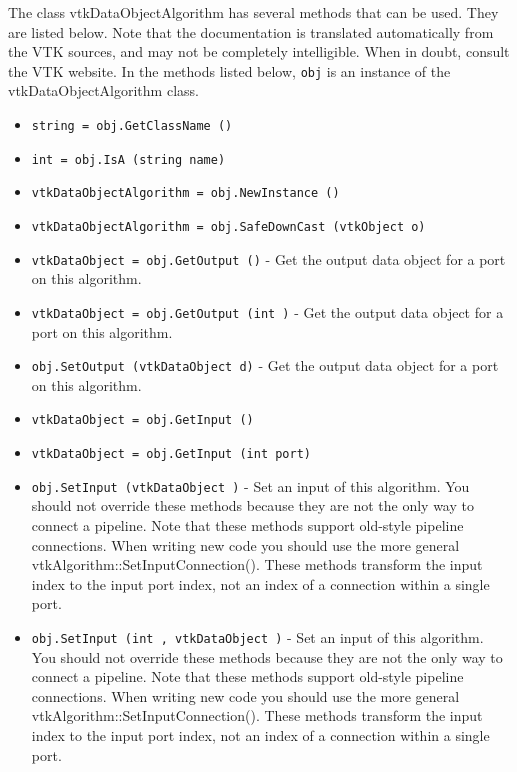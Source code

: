 The class vtkDataObjectAlgorithm has several methods that can be used.
  They are listed below.
Note that the documentation is translated automatically from the VTK sources,
and may not be completely intelligible.  When in doubt, consult the VTK website.
In the methods listed below, \verb|obj| is an instance of the vtkDataObjectAlgorithm class.
\begin{itemize}
\item  \verb|string = obj.GetClassName ()|

\item  \verb|int = obj.IsA (string name)|

\item  \verb|vtkDataObjectAlgorithm = obj.NewInstance ()|

\item  \verb|vtkDataObjectAlgorithm = obj.SafeDownCast (vtkObject o)|

\item  \verb|vtkDataObject = obj.GetOutput ()| -  Get the output data object for a port on this algorithm.

\item  \verb|vtkDataObject = obj.GetOutput (int )| -  Get the output data object for a port on this algorithm.

\item  \verb|obj.SetOutput (vtkDataObject d)| -  Get the output data object for a port on this algorithm.

\item  \verb|vtkDataObject = obj.GetInput ()|

\item  \verb|vtkDataObject = obj.GetInput (int port)|

\item  \verb|obj.SetInput (vtkDataObject )| -  Set an input of this algorithm. You should not override these
 methods because they are not the only way to connect a pipeline.
 Note that these methods support old-style pipeline connections.
 When writing new code you should use the more general
 vtkAlgorithm::SetInputConnection().  These methods transform the
 input index to the input port index, not an index of a connection
 within a single port.

\item  \verb|obj.SetInput (int , vtkDataObject )| -  Set an input of this algorithm. You should not override these
 methods because they are not the only way to connect a pipeline.
 Note that these methods support old-style pipeline connections.
 When writing new code you should use the more general
 vtkAlgorithm::SetInputConnection().  These methods transform the
 input index to the input port index, not an index of a connection
 within a single port.


\end{itemize}
